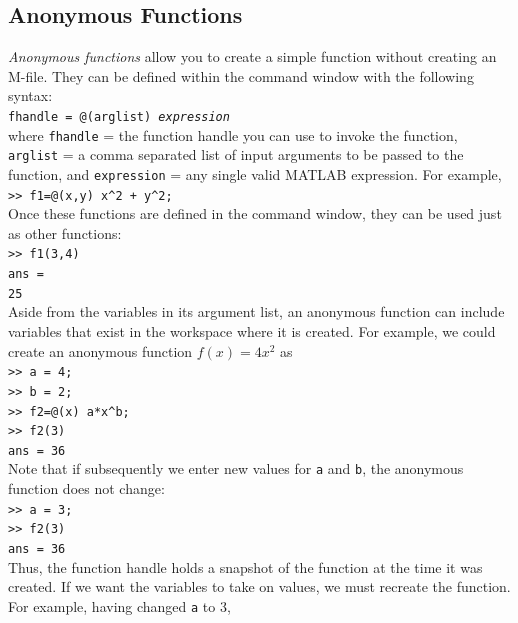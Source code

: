 \documentclass[../main.tex]{subfiles}
\begin{document}
\subsection{Anonymous Functions}
\noindent
\emph{Anonymous functions} allow you to create a simple function without creating an M-file.
They can be defined within the command window with the following syntax:\\

\texttt{fhandle = @(arglist) \emph{expression}}\\

\noindent
where \texttt{fhandle} = the function handle you can use to invoke the function, \texttt{arglist} = a
comma separated list of input arguments to be passed to the function, and \texttt{expression} =
any single valid MATLAB expression. For example,\\

\texttt{>> f1=@(x,y) x\textasciicircum2 + y\textasciicircum2;}\\

\noindent
Once these functions are defined in the command window, they can be used just as other
functions:\\

\texttt{>> f1(3,4)\\
\indent ans =\\
\indent\hspace{2mm} 25}\\

Aside from the variables in its argument list, an anonymous function can include variables
that exist in the workspace where it is created. For example, we could create an
anonymous function $f(x) = 4x^2$ as\\

\texttt{>> a = 4;\\
\indent >> b = 2;\\
\indent >> f2=@(x) a*x\textasciicircum b;\\
\indent >> f2(3)\\
\indent ans = 36}\\

Note that if subsequently we enter new values for \texttt{a} and \texttt{b}, the anonymous function
does not change:\\

\texttt{>> a = 3;\\
\indent >> f2(3)\\
\indent ans = 36}\\

\noindent
Thus, the function handle holds a snapshot of the function at the time it was created. If we
want the variables to take on values, we must recreate the function. For example, having
changed \texttt{a} to 3,\\
\end{document}
